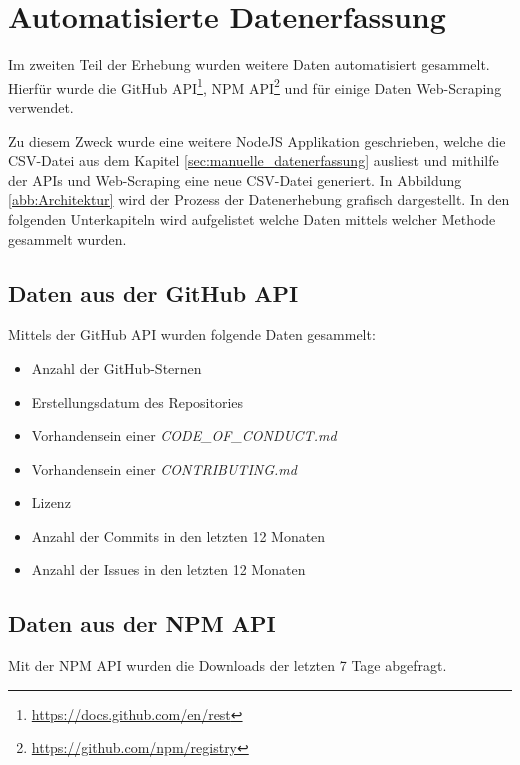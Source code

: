\section{Automatisierte Datenerfassung}\label{sec:automatisierte_datenerfassung}

Im zweiten Teil der Erhebung wurden weitere Daten automatisiert gesammelt. Hierfür wurde die
GitHub API\footnote{\url{https://docs.github.com/en/rest}}, NPM
API\footnote{\url{https://github.com/npm/registry}} und für einige Daten Web-Scraping
verwendet.

Zu diesem Zweck wurde eine weitere NodeJS Applikation geschrieben, welche die CSV-Datei aus dem 
Kapitel \ref{sec:manuelle_datenerfassung} ausliest und mithilfe der APIs und Web-Scraping eine neue 
CSV-Datei generiert. In Abbildung \ref{abb:Architektur} wird der Prozess der Datenerhebung grafisch
dargestellt. In den folgenden Unterkapiteln wird aufgelistet welche Daten mittels welcher Methode gesammelt wurden.


\subsection{Daten aus der GitHub API}
Mittels der GitHub API wurden folgende Daten gesammelt:

\begin{itemize}[noitemsep]
    \item Anzahl der GitHub-Sternen
    \item Erstellungsdatum des Repositories
    \item Vorhandensein einer \textit{CODE\_OF\_CONDUCT.md}
    \item Vorhandensein einer \textit{CONTRIBUTING.md}
    \item Lizenz
    \item Anzahl der Commits in den letzten 12 Monaten
    \item Anzahl der Issues in den letzten 12 Monaten
\end{itemize}


\subsection{Daten aus der NPM API}
Mit der NPM API wurden die Downloads der letzten 7 Tage abgefragt.

